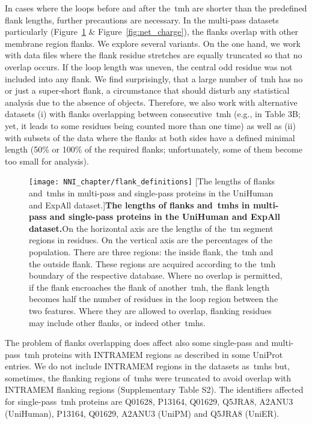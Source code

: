 In cases where the loops before and after the~\gls{tmh} are shorter than the predefined flank lengths, further precautions are necessary.
In the multi-pass datasets particularly (Figure~\ref{fig:flank_definitions} \& Figure~\ref{fig:net_charge}), the flanks overlap with other membrane region flanks.
We explore several variants.
On the one hand, we work with data files where the flank residue stretches are equally truncated so that no overlap occurs.
If the loop length was uneven, the central odd residue was not included into any flank.
We find surprisingly, that a large number of~\gls{tmh} has no or just a super-short flank, a circumstance that should disturb any statistical analysis due to the absence of objects.
Therefore, we also work with alternative datasets (i) with flanks overlapping between consecutive~\gls{tmh} (e.g., in Table 3B; yet, it leads to some residues being counted more than one time) as well as (ii) with subsets of the data where the flanks at both sides have a defined minimal length (50\% or 100\% of the required flanks; unfortunately, some of them become too small for analysis).

\begin{figure}[!ht]
\centering
\texttt{[image: NNI\_chapter/flank\_definitions]}
[The lengths of flanks and~\gls{tmh}s in multi-pass and single-pass proteins in the UniHuman and ExpAll dataset.]{\textbf{The lengths of flanks and~\gls{tmh}s in multi-pass and single-pass proteins in the UniHuman and ExpAll dataset.}On the horizontal axis are the lengths of the~\gls{tm} segment regions in residues.
On the vertical axis are the percentages of the population.
There are three regions: the inside flank, the~\gls{tmh} and the outside flank.
These regions are acquired according to the~\gls{tmh} boundary of the respective database.
Where no overlap is permitted, if the flank encroaches the flank of another~\gls{tmh}, the flank length becomes half the number of residues in the loop region between the two features.
Where they are allowed to overlap, flanking residues may include other flanks, or indeed other~\gls{tmh}s.}

\label{fig:flank_definitions}
\end{figure}

The problem of flanks overlapping does affect also some single-pass and multi-pass~\gls{tmh} proteins with INTRAMEM regions as described in some UniProt entries.
We do not include INTRAMEM regions in the datasets as~\gls{tmh}s but, sometimes, the flanking regions of~\gls{tmh}s were truncated to avoid overlap with INTRAMEM flanking regions (Supplementary Table S2).
 The identifiers affected for single-pass~\gls{tmh} proteins are Q01628, P13164, Q01629, Q5JRA8, A2ANU3 (UniHuman), P13164, Q01629, A2ANU3 (UniPM) and Q5JRA8 (UniER).

